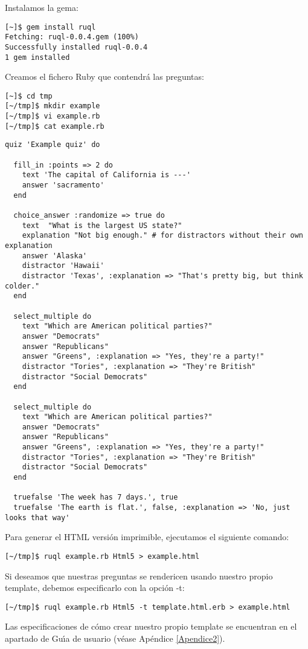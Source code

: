 Instalamos la gema:

\begin{verbatim}
[~]$ gem install ruql
Fetching: ruql-0.0.4.gem (100%)
Successfully installed ruql-0.0.4
1 gem installed
\end{verbatim}

Creamos el fichero Ruby que contendr\'a las preguntas:

\begin{verbatim}
[~]$ cd tmp
[~/tmp]$ mkdir example
[~/tmp]$ vi example.rb
[~/tmp]$ cat example.rb 
\end{verbatim}

\begin{lstlisting}
quiz 'Example quiz' do
  
  fill_in :points => 2 do
    text 'The capital of California is ---'
    answer 'sacramento'
  end
  
  choice_answer :randomize => true do
    text  "What is the largest US state?"
    explanation "Not big enough." # for distractors without their own explanation
    answer 'Alaska'
    distractor 'Hawaii'
    distractor 'Texas', :explanation => "That's pretty big, but think colder."
  end
  
  select_multiple do
    text "Which are American political parties?"
    answer "Democrats"
    answer "Republicans"
    answer "Greens", :explanation => "Yes, they're a party!"
    distractor "Tories", :explanation => "They're British"
    distractor "Social Democrats"
  end
  
  select_multiple do
    text "Which are American political parties?"
    answer "Democrats"
    answer "Republicans"
    answer "Greens", :explanation => "Yes, they're a party!"
    distractor "Tories", :explanation => "They're British"
    distractor "Social Democrats"
  end
  
  truefalse 'The week has 7 days.', true
  truefalse 'The earth is flat.', false, :explanation => 'No, just looks that way'
\end{lstlisting}
\bigskip

Para generar el HTML versi\'on imprimible, ejecutamos el siguiente comando:

\begin{verbatim}
[~/tmp]$ ruql example.rb Html5 > example.html
\end{verbatim}

Si deseamos que nuestras preguntas se rendericen usando nuestro propio template, debemos especificarlo con la opci\'on -t:

\begin{verbatim}
[~/tmp]$ ruql example.rb Html5 -t template.html.erb > example.html
\end{verbatim}

Las especificaciones de c\'omo crear nuestro propio template se encuentran en el apartado de Gu\'{\i}a de usuario (v\'ease Ap\'endice \ref{Apendice2}).